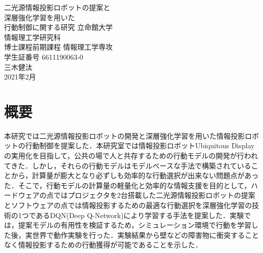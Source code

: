\documentclass[12pt]{sonota/aislab}
\begin{document}

\begin{titlepage}
\centering
\vspace*{3truecm}
\Huge


二光源情報投影ロボットの提案と\\
深層強化学習を用いた\\
行動制御に関する研究
\vfill
\Large
立命館大学\\
情報理工学研究科\\
博士課程前期課程 情報理工学専攻\\[1zh]
学生証番号 6611190063-0\\[0.5zh]
{\LARGE{三木健汰}}\\[2zh]
2021年2月
\end{titlepage}


\let\cleardoublepage\clearpage

\frontmatter

\clearpage
{}
\chapter*{概要}
本研究では二光源情報投影ロボットの開発と深層強化学習を用いた情報投影ロボットの行動制御を提案した．本研究室では情報投影ロボットUbiquitous Displayの実用化を目指して，公共の場で人と共存するための行動モデルの開発が行われてきた．しかし，それらの行動モデルはモデルベースな手法で構築されていることから，計算量が膨大となり必ずしも効率的な行動選択が出来ない問題点があった．そこで，行動モデルの計算量の軽量化と効率的な情報支援を目的として，ハードウェアの点ではプロジェクタを2台搭載した二光源情報投影ロボットの提案とソフトウェアの点では情報投影するための最適な行動選択を深層強化学習の技術の1つであるDQN(Deep Q-Network)により学習する手法を提案した．実験では，提案モデルの有用性を検証するため，シミュレーション環境で行動を学習した後，実世界で動作実験を行った．実験結果から壁などの障害物に衝突することなく情報投影するための行動獲得が可能であることを示した．
\end{document}
